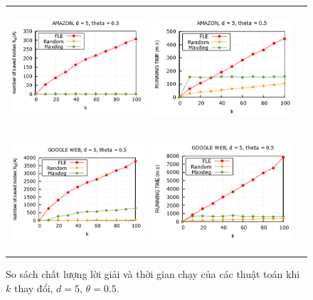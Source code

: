 \begin{figure}
\begin{tabular}{lll}
		\\
		\includegraphics[height = 4.4cm]{picture/FLE/amazon_res} &
		\includegraphics[height = 4.4cm]{picture/FLE/amazon_time} 
		\\
		\includegraphics[height = 4.4cm]{picture/FLE/google_res} &
		\includegraphics[height = 4.4cm]{picture/FLE/google_time} 
	\end{tabular}
	\caption{So sách chất lượng lời giải và thời gian chạy của các thuật toán khi $k$ thay đổi, $d=5$, $\theta=0.5$.} 
	\label{fig:FLE_k}   
\end{figure}

